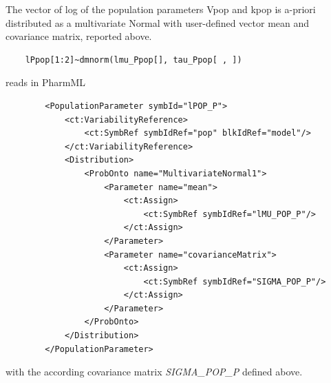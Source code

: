 The vector of log of the population parameters Vpop and kpop is a-priori distributed as a multivariate Normal with user-defined vector mean and covariance matrix, reported above.
\lstset{language=MLX}
\begin{lstlisting}
	lPpop[1:2]~dmnorm(lmu_Ppop[], tau_Ppop[ , ])
\end{lstlisting}
reads in PharmML 
\lstset{language=XML}
\begin{lstlisting}
        <PopulationParameter symbId="lPOP_P">
            <ct:VariabilityReference>
                <ct:SymbRef symbIdRef="pop" blkIdRef="model"/>
            </ct:VariabilityReference>
            <Distribution>
                <ProbOnto name="MultivariateNormal1">
                    <Parameter name="mean">
                        <ct:Assign>
                            <ct:SymbRef symbIdRef="lMU_POP_P"/>
                        </ct:Assign>
                    </Parameter>
                    <Parameter name="covarianceMatrix">
                        <ct:Assign>
                            <ct:SymbRef symbIdRef="SIGMA_POP_P"/>
                        </ct:Assign>
                    </Parameter>
                </ProbOnto>
            </Distribution>
        </PopulationParameter>
\end{lstlisting}
with the according covariance matrix \emph{SIGMA\_POP\_P} defined above.

